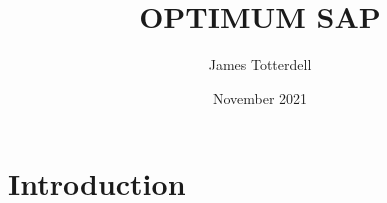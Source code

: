 \documentclass{article}
\title{OPTIMUM SAP}
\author{James Totterdell}
\date{November 2021}
\begin{document}
\maketitle

\section{Introduction}
\end{document}
